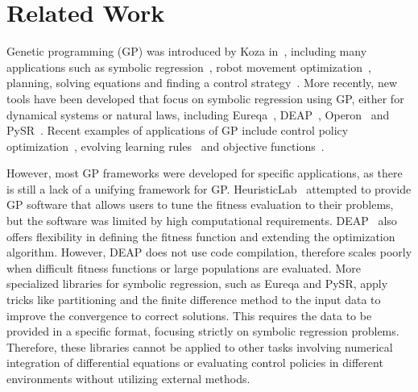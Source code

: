 \section{Related Work}
Genetic programming (GP) was introduced by Koza in~\cite{koza1994genetic}, including many applications such as symbolic regression~\cite{koza1994genetic}, robot movement optimization~\cite{koza1992automatic}, planning, solving equations and finding a control strategy~\cite{koza1990genetic}. More recently, new tools have been developed that focus on symbolic regression using GP, either for dynamical systems or natural laws, including Eureqa~\cite{bongard2007automated, schmidt2009distilling}, DEAP~\cite{fortin2012deap}, Operon~\cite{burlacu2020operon} and PySR~\cite{cranmer2023interpretable}. Recent examples of applications of GP include control policy optimization~\cite{hein2018interpretable,vries2024discovering,nadizar2024naturally}, evolving learning rules~\cite{jordan2021evolving, bengio1994use} and objective functions~\cite{raymond2023fast}.

However, most GP frameworks were developed for specific applications, as there is still a lack of a unifying framework for GP. HeuristicLab~\cite{wagner2005heuristiclab} attempted to provide GP software that allows users to tune the fitness evaluation to their problems, but the software was limited by high computational requirements. DEAP~\cite{fortin2012deap} also offers flexibility in defining the fitness function and extending the optimization algorithm. However, DEAP does not use code compilation, therefore scales poorly when difficult fitness functions or large populations are evaluated. More specialized libraries for symbolic regression, such as Eureqa and PySR, apply tricks like partitioning and the finite difference method to the input data to improve the convergence to correct solutions. This requires the data to be provided in a specific format, focusing strictly on symbolic regression problems. Therefore, these libraries cannot be applied to other tasks involving numerical integration of differential equations or evaluating control policies in different environments without utilizing external methods. 

